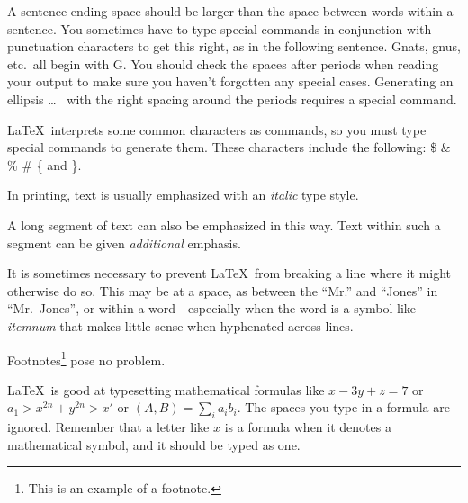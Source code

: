 \documentclass{article}      %
\newcommand{\ip}[2]{(#1, #2)}
\begin{document}
A sentence-ending space should be larger than the
space between words within a sentence.  You
sometimes have to type special commands in
conjunction with punctuation characters to get
this right, as in the following sentence.
       Gnats, gnus, etc.\ all  %
       begin with G\@.         %
You should check the spaces after periods when
reading your output to make sure you haven't
forgotten any special cases.  Generating an
ellipsis
       \ldots\               %
with the right spacing around the periods requires
a special command.

\LaTeX\ interprets some common characters as
commands, so you must type special commands to
generate them.  These characters include the
following:
       \$ \& \% \# \{ and \}.

In printing, text is usually emphasized with an
       \emph{italic}
type style.

\begin{em}
   A long segment of text can also be emphasized
   in this way.  Text within such a segment can be
   given \emph{additional} emphasis.
\end{em}

It is sometimes necessary to prevent \LaTeX\ from
breaking a line where it might otherwise do so.
This may be at a space, as between the ``Mr.'' and
``Jones'' in
       ``Mr.~Jones'',        %
or within a word---especially when the word is a
symbol like
       \mbox{\emph{itemnum}}
that makes little sense when hyphenated across
lines.

Footnotes\footnote{This is an example of a footnote.}
pose no problem.

\LaTeX\ is good at typesetting mathematical formulas
like
       \( x-3y + z = 7 \)
or
       \( a_{1} > x^{2n} + y^{2n} > x' \)
or
       \( \ip{A}{B} = \sum_{i} a_{i} b_{i} \).
The spaces you type in a formula are
ignored.  Remember that a letter like
       $x$                   %
is a formula when it denotes a mathematical
symbol, and it should be typed as one.
\end{document}
